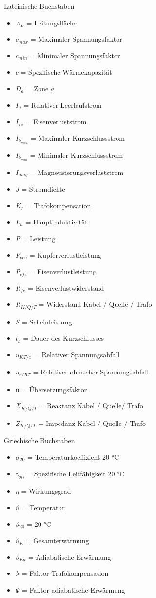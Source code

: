 \documentclass[11pt, a4paper, final, fleqn, twocolumn]{article}
\numberwithin{equation}{subsection}
\begin{document}
Lateinische Buchstaben
\begin{itemize}
    \item \(A_L\) = Leitungsfläche
    \item \(c_{max}\) = Maximaler Spannungsfaktor
    \item \(c_{min}\) = Minimaler Spannungsfaktor
    \item \(c\) = Spezifische Wärmekapazität
    \item \(D_a\) = Zone \(a\)
    \item \(I_0\) = Relativer Leerlaufstrom
    \item \(I_{fe}\) = Eisenverluststrom
    \item \(I_{k_{max}}\) = Maximaler Kurzschlussstrom
    \item \(I_{k_{min}}\) = Minimaler Kurzschlussstrom
    \item \(I_{mag}\) = Magnetisierungsverluststrom
    \item \(J\) = Stromdichte
    \item \(K_r\) = Trafokompensation
    \item \(L_h\) = Hauptinduktivität
    \item \(P\) = Leistung
    \item \(P_{vcu}\) = Kupferverlustleistung
    \item \(P_{vfe}\) = Eisenverlustleistung
    \item \(R_{fe}\) = Eisenverlustwiderstand
    \item \(R_{K/Q/T}\) = Widerstand Kabel / Quelle / Trafo
    \item \(S\) = Scheinleistung
    \item \(t_k\) = Dauer des Kurzschlusses
    \item \(u_{KT/x}\) = Relativer Spannungsabfall
    \item \(u_{r/RT}\) = Relativer ohmscher Spannungsabfall
    \item ü = Übersetzungsfaktor
    \item \(X_{K/Q/T}\) = Reaktanz Kabel / Quelle/ Trafo
    \item \(Z_{K/Q/T}\) = Impedanz Kabel / Quelle / Trafo
\end{itemize}

\noindent Griechische Buchstaben
\begin{itemize}
    \item \(\alpha_{20}\) = Temperaturkoeffizient 20 °C
    \item \(\gamma_{20}\) = Spezifische Leitfähigkeit 20 °C
    \item \(\eta\) = Wirkungsgrad
    \item \(\vartheta\) = Temperatur
    \item \(\vartheta_{20}\) = 20 °C
    \item \(\vartheta_{E}\) = Gesamterwärmung
    \item \(\vartheta_{Ea}\) = Adiabatische Erwärmung
    \item \(\lambda\) = Faktor Trafokompensation
    \item \(\Psi\) = Faktor adiabatische Erwärmung
\end{itemize}
\end{document}
